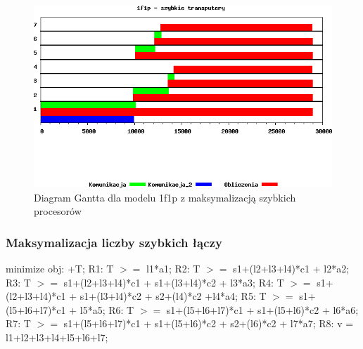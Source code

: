 \documentclass[a4paper,11pt, titlepage]{article}
\begin{document}
\begin{figure}[p!]
\includegraphics[width=1.0\textwidth]{wykresy/1p1f_proc}
\caption{Diagram Gantta dla modelu 1f1p z maksymalizacją szybkich procesorów \label{1p1f_p}}
\end{figure}
\subsubsection{Maksymalizacja liczby szybkich łączy}
\begin{flushleft}

minimize obj: +T;\linebreak
\linebreak
R1: T $>=$ l1*a1;\linebreak
R2: T $>=$ s1+(l2+l3+l4)*c1 + l2*a2;\linebreak
R3: T $>=$ s1+(l2+l3+l4)*c1 + s1+(l3+l4)*c2 + l3*a3;\linebreak
R4: T $>=$ s1+(l2+l3+l4)*c1 + s1+(l3+l4)*c2 + s2+(l4)*c2 +l4*a4;\linebreak
R5: T $>=$ s1+(l5+l6+l7)*c1 + l5*a5;\linebreak
R6: T $>=$ s1+(l5+l6+l7)*c1 + s1+(l5+l6)*c2 + l6*a6;\linebreak
R7: T $>=$ s1+(l5+l6+l7)*c1 + s1+(l5+l6)*c2 +  s2+(l6)*c2 + l7*a7;\linebreak
R8: v = l1+l2+l3+l4+l5+l6+l7;\linebreak
\end{flushleft}
\end{document}
